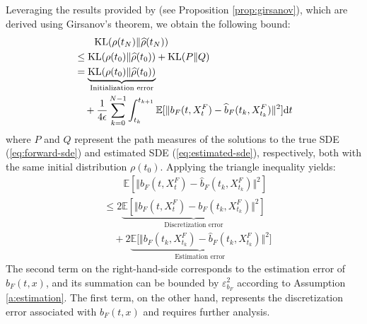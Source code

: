 Leveraging the results provided by \citet{chen2023ddpm} (see Proposition \ref{prop:girsanov}), which are derived using Girsanov's theorem, we obtain the following bound:
$$\begin{aligned}
    &\qquad\textnormal{KL}(\rho(t_N)\Vert\widehat{\rho}(t_N))\\
    &\le\text{KL}(\rho(t_0)\Vert\widehat{\rho}(t_0))+\text{KL}(P\Vert Q)\\
    &=\underbrace{\text{KL}(\rho(t_0)\Vert\widehat{\rho}(t_0))}_{\text{Initialization error}}\\
    &\quad+\frac{1}{4\epsilon}\sum_{k=0}^{N-1}\int_{t_k}^{t_{k+1}}\mathbb{E}[\Vert b_F(t,X_t^F)-\widehat{b}_F(t_k,X_{t_k}^F)\Vert^2]\textnormal{d} t
\end{aligned}$$
where $P$ and $Q$ represent the path measures of the solutions to the true SDE (\ref{eq:forward-sde}) and estimated SDE (\ref{eq:estimated-sde}), respectively, both with the same initial distribution $\rho(t_0)$. Applying the triangle inequality yields: 
$$\begin{aligned}
    &\qquad\mathbb{E}[\Vert b_F(t,X_t^F)-\hat{b}_F(t_k,X_{t_k}^F)\Vert^2]\\
    &\le2\underbrace{\mathbb{E}[\Vert b_F(t,X_t^F)-b_F(t_k,X_{t_k}^F)\Vert^2]}_{\text{Discretization error}}\\
    &\quad+2\underbrace{\mathbb{E}[\Vert b_F(t_k,X_{t_k}^F)-\hat{b}_F(t_k,X_{t_k}^F)\Vert^2}_{\text{Estimation error}}]
\end{aligned}$$
The second term on the right-hand-side corresponds to the estimation error of $\hat{b}_F(t,x)$, and its summation can be bounded by $\varepsilon_{b_F}^2$ according to Assumption \ref{a:estimation}. The first term, on the other hand, represents the discretization error associated with $b_F(t,x)$ and requires further analysis.

